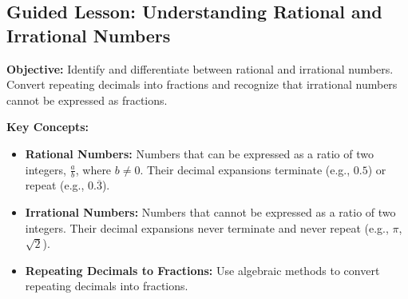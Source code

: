 \documentclass[12pt]{article}
\title{}
\date{}
\begin{document}
\subsection*{Guided Lesson: Understanding Rational and Irrational Numbers}
\onehalfspacing

\begin{tcolorbox}[colframe=black!40, colback=gray!5, 
coltitle=black, colbacktitle=black!20, fonttitle=\bfseries\Large, 
title=Learning Objective, halign title=center, left=5pt, right=5pt, top=5pt, bottom=15pt]
\textbf{Objective:} Identify and differentiate between rational and irrational numbers. Convert repeating decimals into fractions and recognize that irrational numbers cannot be expressed as fractions.
\end{tcolorbox}

\begin{tcolorbox}[colframe=black!60, colback=white, 
coltitle=black, colbacktitle=black!15, fonttitle=\bfseries\Large, 
title=Key Concepts and Vocabulary, halign title=center, left=10pt, right=10pt, top=10pt, bottom=15pt]
\textbf{Key Concepts:}
\begin{itemize}
    \item \textbf{Rational Numbers:} Numbers that can be expressed as a ratio of two integers, \( \frac{a}{b} \), where \(b \neq 0\). Their decimal expansions terminate (e.g., \(0.5\)) or repeat (e.g., \(0.\overline{3}\)).
    \item \textbf{Irrational Numbers:} Numbers that cannot be expressed as a ratio of two integers. Their decimal expansions never terminate and never repeat (e.g., \(\pi\), \(\sqrt{2}\)).
    \item \textbf{Repeating Decimals to Fractions:} Use algebraic methods to convert repeating decimals into fractions.
\end{itemize}
\end{tcolorbox}
\end{document}
